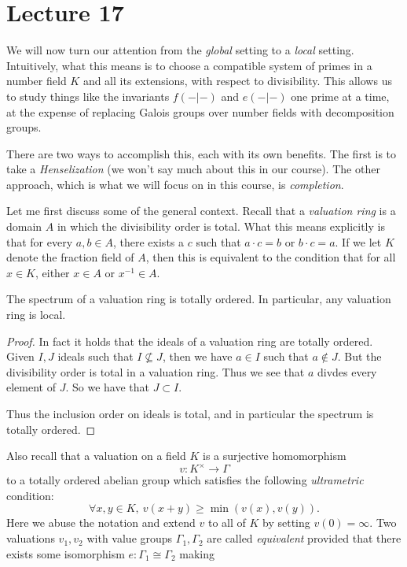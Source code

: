 \section{Lecture 17}

We will now turn our attention from the \emph{global} setting to a \emph{local} setting.
Intuitively, what this means is to choose a compatible system of primes in a number field $K$ and all its extensions, with respect to divisibility.
This allows us to study things like the invariants $f(-|-)$ and $e(-|-)$ one prime at a time, at the expense of replacing Galois groups over number fields with decomposition groups.

There are two ways to accomplish this, each with its own benefits.
The first is to take a \emph{Henselization} (we won't say much about this in our course).
The other approach, which is what we will focus on in this course, is \emph{completion}.

Let me first discuss some of the general context.
Recall that a \emph{valuation ring} is a domain $A$ in which the divisibility order is total.
What this means explicitly is that for every $a,b \in A$, there exists a $c$ such that $a \cdot c = b$ or $b \cdot c = a$.
If we let $K$ denote the fraction field of $A$, then this is equivalent to the condition that for all $x \in K$, either $x \in A$ or $x^{-1} \in A$.

\begin{lemma}
  The spectrum of a valuation ring is totally ordered.
  In particular, any valuation ring is local.
\end{lemma}
\begin{proof}
  In fact it holds that the ideals of a valuation ring are totally ordered.
  Given $I,J$ ideals such that $I \not\subseteq J$, then we have $a \in I$ such that $a \notin J$.
  But the divisibility order is total in a valuation ring. Thus we see that $a$ divdes every element of $J$. 
  So we have that $J \subset I$.

  Thus the inclusion order on ideals is total, and in particular the spectrum is totally ordered.
\end{proof}

Also recall that a valuation on a field $K$ is a surjective homomorphism
\[ v : K^{\times} \to \Gamma \]
to a totally ordered abelian group which satisfies the following \emph{ultrametric} condition:
\[ \forall x,y \in K, \ v(x+y) \geq \min(v(x),v(y)). \]
Here we abuse the notation and extend $v$ to all of $K$ by setting $v(0) = \infty$.
Two valuations $v_{1},v_{2}$ with value groups $\Gamma_{1},\Gamma_{2}$ are called \emph{equivalent} provided that there exists some isomorphism $e : \Gamma_{1} \cong \Gamma_{2}$ making 

